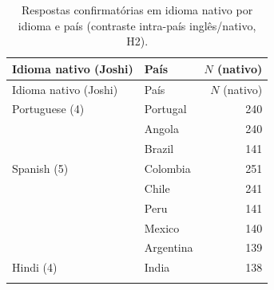 \begin{longtable}{llr}
\caption{Respostas confirmatórias em idioma nativo por idioma e país (contraste intra-país inglês/nativo, H2).\label{tab:s-native}}\\
\toprule Idioma nativo (Joshi) & País & $N$ (nativo) \\ \midrule \endfirsthead
\toprule Idioma nativo (Joshi) & País & $N$ (nativo) \\ \midrule \endhead
Portuguese (4) & Portugal & 240 \\
 & Angola & 240 \\
 & Brazil & 141 \\
\addlinespace
Spanish (5) & Colombia & 251 \\
 & Chile & 241 \\
 & Peru & 141 \\
 & Mexico & 140 \\
 & Argentina & 139 \\
\addlinespace
Hindi (4) & India & 138 \\
\addlinespace
\bottomrule
\end{longtable}
